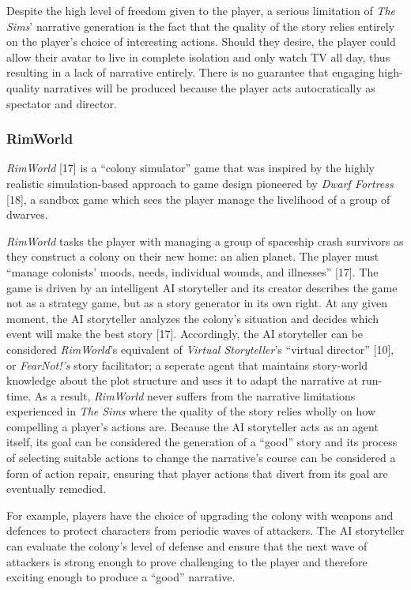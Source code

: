 \documentclass{sig-alternate-05-2015}
\begin{document}
Despite the high level of freedom given to the player, a serious limitation of \textit{The Sims}' narrative generation is the fact that the quality of the story relies entirely on the player's choice of interesting actions. Should they desire, the player could allow their avatar to live in complete isolation and only watch TV all day, thus resulting in a lack of narrative entirely. There is no guarantee that engaging high-quality narratives will be produced because the player acts autocratically as spectator and director.

\subsubsection{RimWorld}
\textit{RimWorld} [17] is a ``colony simulator'' game that was inspired by the highly realistic simulation-based approach to game design pioneered by \textit{Dwarf Fortress} [18], a sandbox game which sees the player manage the livelihood of a group of dwarves.

\textit{RimWorld} tasks the player with managing a group of spaceship crash survivors as they construct a colony on their new home: an alien planet. The player must ``manage colonists' moods, needs, individual wounds, and illnesses'' [17]. The game is driven by an intelligent AI storyteller and its creator describes the game not as a strategy game, but as a story generator in its own right. At any given moment, the AI storyteller analyzes the colony's situation and decides which event will make the best story [17]. Accordingly, the AI storyteller can be considered \textit{RimWorld}'s equivalent of \textit{Virtual Storyteller}'s ``virtual director'' [10], or \textit{FearNot!'s} story facilitator;  a seperate agent that maintains story-world knowledge about the plot structure and uses it to adapt the narrative at run-time. As a result, \textit{RimWorld} never suffers from the narrative limitations experienced in \textit{The Sims} where the quality of the story relies wholly on how compelling a player's actions are. Because the AI storyteller acts as an agent itself, its goal can be considered the generation of a ``good'' story and its process of selecting suitable actions to change the narrative's course can be considered a form of action repair, ensuring that player actions that divert from its goal are eventually remedied. 

For example, players have the choice of upgrading the colony with weapons and defences to protect characters from periodic waves of attackers. The AI storyteller can evaluate the colony's level of defense and ensure that the next wave of attackers is strong enough to prove challenging to the player and therefore exciting enough to produce a ``good'' narrative.
\end{document}
